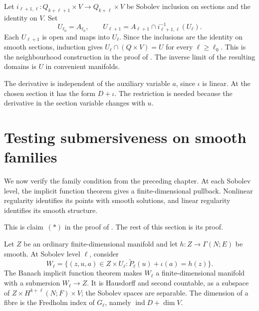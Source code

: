 Let $i_{\ell+1,\ell}\colon Q_{k+\ell+1}\times V\to Q_{k+\ell}\times V$
be Sobolev inclusion on sections and the identity on $V$. Set
\[
 U_{\ell_0}=A_{\ell_0},\qquad
 U_{\ell+1}=A_{\ell+1}\cap i_{\ell+1,\ell}^{-1}(U_\ell).
\]
Each $U_{\ell+1}$ is open and maps into $U_\ell$. Since the inclusions
are the identity on smooth sections, induction gives
$U_\ell\cap(Q\times V)=U$ for every $\ell\geq\ell_0$.
This is the neighbourhood construction in the proof of
\cite[Theorem~3.4.3, p.~69]{Steffens_Representability_Elliptic_Moduli}.
The inverse limit of the resulting domains is $U$ in convenient
manifolds.

The derivative is independent of the auxiliary variable $a$, since
$\iota$ is linear. At the chosen section it has the form $D+\iota$.
The restriction is needed because the derivative in the section variable
changes with $u$.

\section{Testing submersiveness on smooth families}

We now verify the family condition from the preceding chapter. At each
Sobolev level, the implicit function theorem gives a finite-dimensional
pullback. Nonlinear regularity identifies its points with smooth
solutions, and linear regularity identifies its smooth structure.


This is claim~$(*)$ in the proof of
\cite[Theorem~3.4.3]{Steffens_Representability_Elliptic_Moduli}.
The rest of this section is its proof.

Let $Z$ be an ordinary finite-dimensional manifold and let
$h\colon Z\to\Gamma(N;E)$ be smooth.
At Sobolev level $\ell$, consider
\begin{equation}\label{eq:Sobolev_Test_Family}
 W_\ell
 =\{(z,u,a)\in Z\times U_\ell:
       \widetilde P_\ell(u)+\iota(a)=h(z)\}.
\end{equation}
The Banach implicit function theorem makes $W_\ell$ a finite-dimensional
manifold with a submersion $W_\ell\to Z$. It is Hausdorff and second
countable, as a subspace of $Z\times H^{k+\ell}(N;F)\times V$; the
Sobolev spaces are separable.
The dimension of a fibre is the Fredholm index of $G_\ell$, namely
$\operatorname{ind}D+\dim V$.

